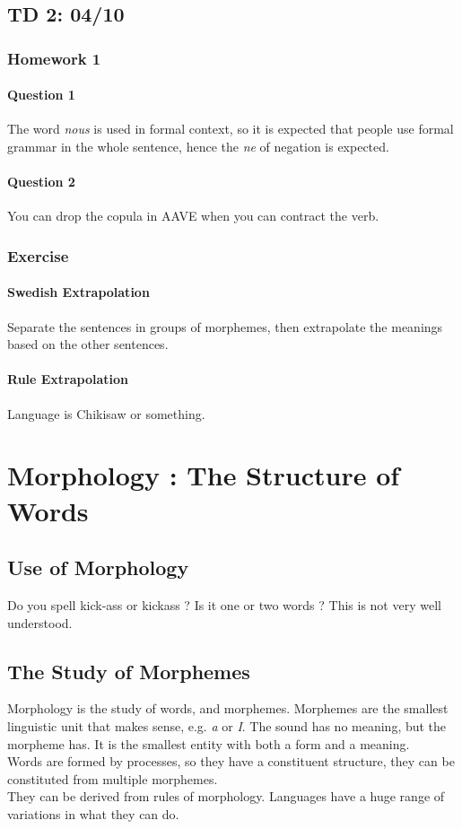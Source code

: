 \documentclass{cours}
\begin{document}
\subsection{TD 2\!: 04/10}
\subsubsection{Homework 1}
\paragraph{Question 1}
The word \textsl{nous} is used in formal context, so it is expected that people use formal grammar in the whole sentence, hence the \textsl{ne} of negation is expected.

\paragraph{Question 2}
You can drop the copula in AAVE when you can contract the verb.

\subsubsection{Exercise}
\paragraph{Swedish Extrapolation}
Separate the sentences in groups of morphemes, then extrapolate the meanings based on the other sentences.

\paragraph{Rule Extrapolation}
Language is Chikisaw or something.

\section[Cours 3\!: 05/10]{Morphology\! : The Structure of Words}
\subsection{Use of Morphology}
Do you spell kick-ass or kickass ? Is it one or two words ? This is not very well understood.

\subsection{The Study of Morphemes}
Morphology is the study of words, and morphemes. Morphemes are the smallest linguistic unit that makes sense, e.g. \textsl{a} or \textsl{I}.
The sound has no meaning, but the morpheme has. It is the smallest entity with both a form and a meaning.\\
Words are formed by processes, so they have a constituent structure, they can be constituted from multiple morphemes.\\
They can be derived from rules of morphology. Languages have a huge range of variations in what they can do.\\
\end{document}
